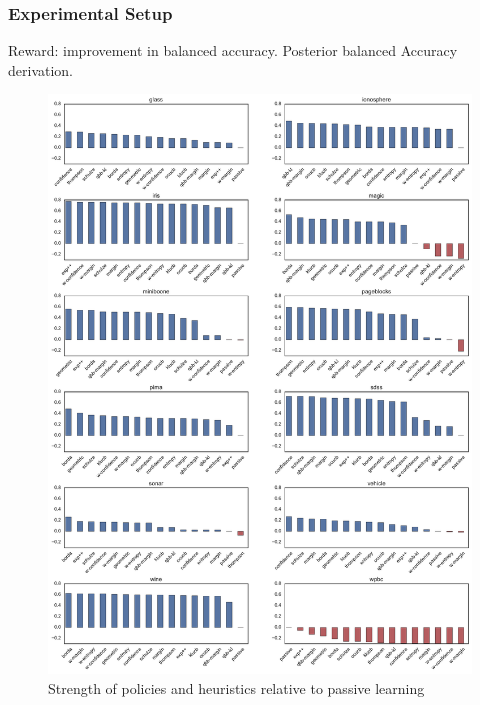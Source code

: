\documentclass[fleqn,10pt,lineno]{wlpeerj} %
\begin{document}
\subsubsection*{Experimental Setup}

Reward: improvement in balanced accuracy. Posterior balanced Accuracy derivation.

\begin{figure}[tbp]
	\centering
	\includegraphics[width=\textwidth]{figures/strengths}
	\caption[Policy strength]{Strength of policies and heuristics relative to passive learning}
	\label{fig:strengths}
\end{figure}
\end{document}
